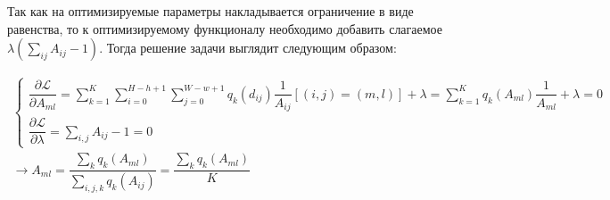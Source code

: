 Так как на оптимизируемые параметры накладывается ограничение в виде равенства, то к оптимизируемому функционалу необходимо добавить слагаемое $\lambda (\sum_{ij} A_{ij} - 1)$. Тогда решение задачи выглядит следующим образом:

\begin{gather*}
	\begin{cases}
		\dfrac{\partial \mathcal{L}}{\partial A_{ml}} = \sum_{k=1}^{K} \sum_{i=0}^{H-h+1} \sum_{j=0}^{W-w+1} q_k(d_{ij}) \dfrac{1}{A_{ij}} [(i,j) = (m, l)] + \lambda = \sum_{k=1}^{K} q_k(A_{ml}) \dfrac{1}{A_{ml}} + \lambda = 0 \\
		\dfrac{\partial \mathcal{L}}{\partial \lambda} = \sum_{i, j} A_{ij} - 1 = 0
	\end{cases}\\	
	\rightarrow A_{ml} = \dfrac{\sum_{k} q_k (A_{ml})}{\sum_{i, j, k} q_k(A_{ij})} = \dfrac{\sum_{k} q_k (A_{ml})}{K}
\end{gather*} 
